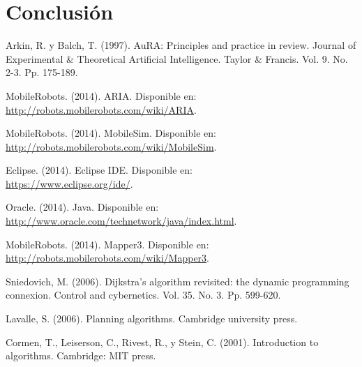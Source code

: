 \documentclass[11pt,twoside,A5]{article}
\newcommand{\link}[1]{{\footnotesize\url{#1}}}
\begin{document}
\section*{Conclusión}

\begin{thebibliography}{999}

	Arkin, R. y Balch, T. (1997).
 	AuRA: Principles and practice in review.
	Journal of Experimental \& Theoretical Artificial Intelligence.
	Taylor \& Francis. Vol. 9. No. 2-3. Pp. 175-189.
	
	MobileRobots. (2014).
	ARIA. 	
	Disponible en: \\\link{http://robots.mobilerobots.com/wiki/ARIA}.
	
	MobileRobots. (2014).
	MobileSim. 	
	Disponible en: \\\link{http://robots.mobilerobots.com/wiki/MobileSim}.
	
	Eclipse. (2014).
	Eclipse IDE. 	
	Disponible en: \\\link{https://www.eclipse.org/ide/}.

	Oracle. (2014).
	Java. 	
	Disponible en: \\\link{http://www.oracle.com/technetwork/java/index.html}.
	
	MobileRobots. (2014).
	Mapper3. 	
	Disponible en: \\\link{http://robots.mobilerobots.com/wiki/Mapper3}.
	
	Sniedovich, M. (2006). 
	Dijkstra's algorithm revisited: the dynamic programming connexion. 
	Control and cybernetics.
	Vol. 35. No. 3. Pp. 599-620.

	Lavalle, S. (2006). Planning algorithms. Cambridge university press.
	
	Cormen, T., Leiserson, C., Rivest, R., y Stein, C. (2001). Introduction to algorithms. Cambridge: MIT press.
	
\end{thebibliography}
\end{document}
